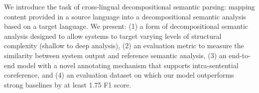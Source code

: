 We introduce the task of cross-lingual decompositional semantic parsing: mapping content provided in a source language into a decompositional semantic analysis based on a target language. We present: (1) a form of decompositional semantic analysis designed to allow systems to target varying levels of structural complexity (shallow to deep analysis), (2) an evaluation metric to measure the similarity between system output and reference semantic analysis, (3) an end-to-end model with a novel annotating mechanism that supports intra-sentential coreference, and (4) an evaluation dataset on which our model outperforms strong baselines by at least 1.75 F1 score.
